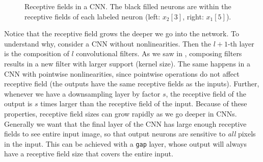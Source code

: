 \begin{figure}[h!]
{\begin{minipage}{0.49\linewidth}
{
    }
    \end{minipage}
    }
    \caption{Receptive fields in a CNN. The black filled neurons are within the receptive fields of each labeled neuron (left: ${x_2[3]}$, right: ${x_1[5]}$).}
    \label{fig:convolutional_neural_networks:RFs}
\end{figure}

Notice that the receptive field grows the deeper we go into the network. To understand why, consider a CNN without nonlinearities. Then the $l+1$-th layer is the composition of $l$ convolutional filters. As we saw in \sect{\ref{sec:linear_image_filtering:properties_of_the_convolution}}, composing filters results in a new filter with larger support (kernel size). The same happens in a CNN with pointwise nonlinearities, since pointwise operations do not affect receptive field (the outputs have the same receptive fields as the inputs). Further, whenever we have a downsampling layer by factor $s$, the receptive field of the output is $s$ times larger than the receptive field of the input. Because of these properties, receptive field sizes can grow rapidly as we go deeper in CNNs. Generally we want that the final layer of the CNN has large enough receptive fields to see entire input image, so that output neurons are sensitive to \textit{all} pixels in the input. This can be achieved with a \texttt{gap} layer, whose output will always have a receptive field size that covers the entire input.

